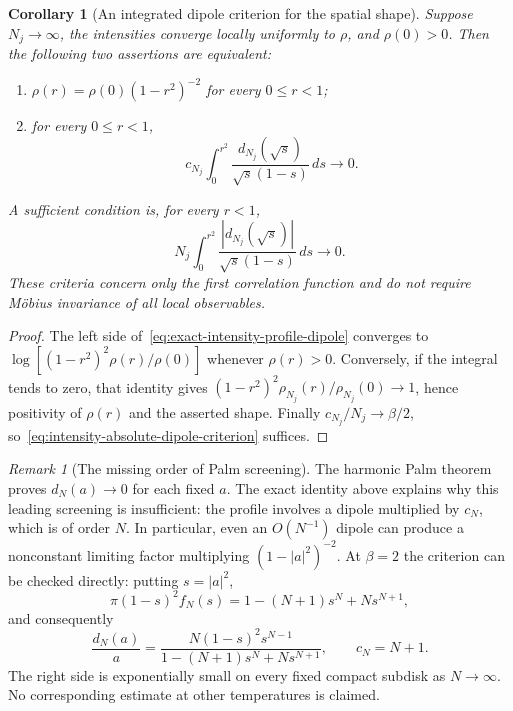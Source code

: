 \documentclass[11pt,a4paper]{article}
\numberwithin{equation}{section}
\newtheorem{corollary}[theorem]{Corollary}
\theoremstyle{definition}
\theoremstyle{remark}
\newtheorem{remark}[theorem]{Remark}
\begin{document}
\begin{corollary}[An integrated dipole criterion for the spatial shape]
\label{cor:intensity-integrated-dipole-criterion}
Suppose $N_j\to\infty$, the intensities converge locally uniformly
to $\rho$, and $\rho(0)>0$. Then the following two assertions are
equivalent:
\begin{enumerate}
\item $\rho(r)=\rho(0)(1-r^2)^{-2}$ for every $0\le r<1$;
\item for every $0\le r<1$,
\[
 c_{N_j}\int_0^{r^2}
 \frac{d_{N_j}(\sqrt{s})}{\sqrt{s}(1-s)}\,ds\longrightarrow0.
\]
\end{enumerate}
A sufficient condition is, for every $r<1$,
\begin{equation}
 N_j\int_0^{r^2}
     \frac{|d_{N_j}(\sqrt{s})|}{\sqrt{s}(1-s)}\,ds
     \longrightarrow0.
 \label{eq:intensity-absolute-dipole-criterion}
\end{equation}
These criteria concern only the first correlation function and do
not require M\"obius invariance of all local observables.
\end{corollary}

\begin{proof}
The left side of~\eqref{eq:exact-intensity-profile-dipole} converges
to $\log[(1-r^2)^2\rho(r)/\rho(0)]$ whenever $\rho(r)>0$.
Conversely, if the integral tends to zero, that identity gives
$(1-r^2)^2\rho_{N_j}(r)/\rho_{N_j}(0)\to1$, hence positivity of
$\rho(r)$ and the asserted shape. Finally $c_{N_j}/N_j\to\beta/2$,
so~\eqref{eq:intensity-absolute-dipole-criterion} suffices.
\end{proof}

\begin{remark}[The missing order of Palm screening]
The harmonic Palm theorem proves $d_N(a)\to0$ for each fixed $a$.
The exact identity above explains why this leading screening is
insufficient: the profile involves a dipole multiplied by $c_N$,
which is of order $N$. In particular, even an $O(N^{-1})$ dipole
can produce a nonconstant limiting factor multiplying
$(1-|a|^2)^{-2}$. At $\beta=2$ the criterion can be checked
directly: putting $s=|a|^2$,
\[
 \pi(1-s)^2 f_N(s)=1-(N+1)s^N+Ns^{N+1},
\]
and consequently
\[
 \frac{d_N(a)}a
 =\frac{N(1-s)^2s^{N-1}}
       {1-(N+1)s^N+Ns^{N+1}},\qquad c_N=N+1.
\]
The right side is exponentially small on every fixed compact
subdisk as $N\to\infty$. No corresponding estimate at other
temperatures is claimed.
\end{remark}
\end{document}
